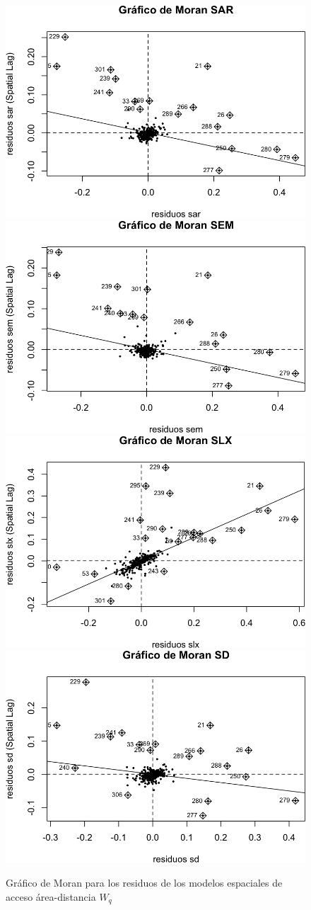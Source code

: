 \documentclass[12pt,]{book}
\begin{document}
\begin{figure}
\includegraphics[width=0.49\linewidth]{tesis-unigis_files/figure-latex/moranplot-resmodel-areasdist-all-wq-1} \includegraphics[width=0.49\linewidth]{tesis-unigis_files/figure-latex/moranplot-resmodel-areasdist-all-wq-2} \includegraphics[width=0.49\linewidth]{tesis-unigis_files/figure-latex/moranplot-resmodel-areasdist-all-wq-3} \includegraphics[width=0.49\linewidth]{tesis-unigis_files/figure-latex/moranplot-resmodel-areasdist-all-wq-4} \caption{Gráfico de Moran para los residuos de los modelos espaciales de acceso área-distancia $W_{q}$}\label{fig:moranplot-resmodel-areasdist-all-wq}
\end{figure}
\end{document}
